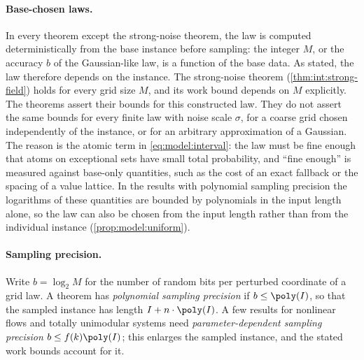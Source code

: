 \paragraph{Base-chosen laws.}
In every theorem except the strong-noise theorem, the law is computed
deterministically from the base instance before sampling: the integer $M$,
or the accuracy $b$ of the Gaussian-like law, is a function of the base data.
As stated, the law therefore depends on the instance. The strong-noise theorem
(\cref{thm:int:strong-field}) holds for every grid size $M$, and its work
bound depends on $M$ explicitly. The theorems assert their bounds for this
constructed law. They do not assert the same bounds for every finite law
with noise scale $\sigma$, for a coarse grid chosen independently of the
instance, or for an arbitrary approximation of a Gaussian. The reason is the
atomic term in \eqref{eq:model:interval}: the law must be fine enough that
atoms on exceptional sets have small total probability, and ``fine enough''
is measured against base-only quantities, such as the cost of an exact
fallback or the spacing of a value lattice. In the results with polynomial
sampling precision the logarithms of these quantities are bounded by
polynomials in the input length alone, so the law can also be chosen from
the input length rather than from the individual instance
(\cref{prop:model:uniform}).

\paragraph{Sampling precision.}
Write $b=\log_2M$ for the number of random bits per perturbed coordinate of a
grid law. A theorem has \emph{polynomial sampling precision} if
$b\le\poly(I)$, so that the sampled instance has length
$I+n\cdot\poly(I)$. A few results for nonlinear flows and totally
unimodular systems need \emph{parameter-dependent sampling precision}
$b\le f(k)\poly(I)$; this enlarges the sampled instance, and the stated work
bounds account for it.

